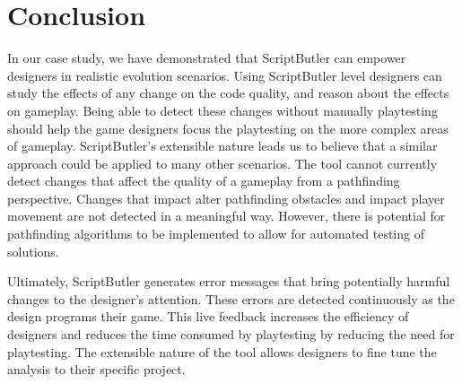 \section{Conclusion}
In our case study, we have demonstrated that ScriptButler can empower designers in realistic evolution scenarios. Using ScriptButler level designers can study the effects of any change on the code quality, and reason about the effects on gameplay. Being able to detect these changes without manually playtesting should help the game designers focus the playtesting on the more complex areas of gameplay. ScriptButler's extensible nature leads us to believe that a similar approach could be applied to many other scenarios. The tool cannot currently detect changes that affect the quality of a gameplay from a pathfinding perspective. Changes that impact alter pathfinding obstacles and impact player movement are not detected in a meaningful way. However, there is potential for pathfinding algorithms to be implemented to allow for automated testing of solutions. 

Ultimately, ScriptButler generates error messages that bring potentially harmful changes to the designer's attention. These errors are detected continuously as the design programs their game. This live feedback increases the efficiency of designers and reduces the time consumed by playtesting by reducing the need for playtesting. The extensible nature of the tool allows designers to fine tune the analysis to their specific project.
